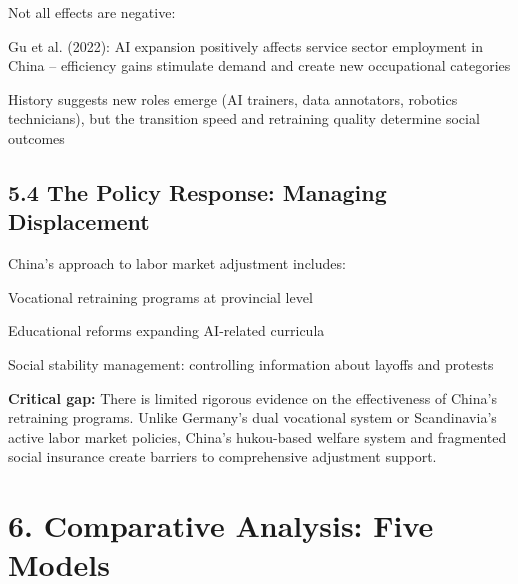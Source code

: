 \documentclass[11pt,a4paper]{article}
\begin{document}
Not all effects are negative:
\item Gu et al. (2022): AI expansion positively affects service sector employment in China -- efficiency gains stimulate demand and create new occupational categories
\item History suggests new roles emerge (AI trainers, data annotators, robotics technicians), but the transition speed and retraining quality determine social outcomes

\subsection{5.4 The Policy Response: Managing Displacement}

China's approach to labor market adjustment includes:
\item Vocational retraining programs at provincial level
\item Educational reforms expanding AI-related curricula
\item Social stability management: controlling information about layoffs and protests

\textbf{Critical gap:} There is limited rigorous evidence on the effectiveness of China's retraining programs. Unlike Germany's dual vocational system or Scandinavia's active labor market policies, China's hukou-based welfare system and fragmented social insurance create barriers to comprehensive adjustment support.


\section{6. Comparative Analysis: Five Models}
\end{document}
